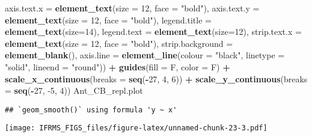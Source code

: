 \documentclass[
]{article}
\newenvironment{Shaded}{\begin{snugshade}}{\end{snugshade}}
\newcommand{\DataTypeTok}[1]{\textcolor[rgb]{0.13,0.29,0.53}{#1}}
\newcommand{\DecValTok}[1]{\textcolor[rgb]{0.00,0.00,0.81}{#1}}
\newcommand{\KeywordTok}[1]{\textcolor[rgb]{0.13,0.29,0.53}{\textbf{#1}}}
\newcommand{\NormalTok}[1]{#1}
\newcommand{\OperatorTok}[1]{\textcolor[rgb]{0.81,0.36,0.00}{\textbf{#1}}}
\newcommand{\StringTok}[1]{\textcolor[rgb]{0.31,0.60,0.02}{#1}}
\begin{document}
\begin{Shaded}
\begin{Highlighting}[]
         \DataTypeTok{axis.text.x =} \KeywordTok{element_text}\NormalTok{(}\DataTypeTok{size =} \DecValTok{12}\NormalTok{, }\DataTypeTok{face =} \StringTok{"bold"}\NormalTok{),}
         \DataTypeTok{axis.text.y =} \KeywordTok{element_text}\NormalTok{(}\DataTypeTok{size =} \DecValTok{12}\NormalTok{, }\DataTypeTok{face =} \StringTok{"bold"}\NormalTok{),}
         \DataTypeTok{legend.title =} \KeywordTok{element_text}\NormalTok{(}\DataTypeTok{size=}\DecValTok{14}\NormalTok{), }
         \DataTypeTok{legend.text =} \KeywordTok{element_text}\NormalTok{(}\DataTypeTok{size=}\DecValTok{12}\NormalTok{),}
         \DataTypeTok{strip.text.x =} \KeywordTok{element_text}\NormalTok{(}\DataTypeTok{size =} \DecValTok{12}\NormalTok{, }\DataTypeTok{face =} \StringTok{"bold"}\NormalTok{),}
         \DataTypeTok{strip.background =} \KeywordTok{element_blank}\NormalTok{(),}
         \DataTypeTok{axis.line =} \KeywordTok{element_line}\NormalTok{(}\DataTypeTok{colour =} \StringTok{"black"}\NormalTok{, }\DataTypeTok{linetype =} \StringTok{"solid"}\NormalTok{, }\DataTypeTok{lineend =} \StringTok{"round"}\NormalTok{)) }\OperatorTok{+}
\StringTok{   }\KeywordTok{guides}\NormalTok{(}\DataTypeTok{fill =}\NormalTok{ F, }\DataTypeTok{color =}\NormalTok{ F) }\OperatorTok{+}\StringTok{ }
\StringTok{   }\KeywordTok{scale_x_continuous}\NormalTok{(}\DataTypeTok{breaks =} \KeywordTok{seq}\NormalTok{(}\OperatorTok{-}\DecValTok{27}\NormalTok{, }\DecValTok{4}\NormalTok{, }\DecValTok{6}\NormalTok{)) }\OperatorTok{+}\StringTok{ }
\StringTok{   }\KeywordTok{scale_y_continuous}\NormalTok{(}\DataTypeTok{breaks =} \KeywordTok{seq}\NormalTok{(}\OperatorTok{-}\DecValTok{27}\NormalTok{, }\DecValTok{-5}\NormalTok{, }\DecValTok{4}\NormalTok{))}
\NormalTok{Ant_CB_repl.plot}
\end{Highlighting}
\end{Shaded}

\begin{verbatim}
## `geom_smooth()` using formula 'y ~ x'
\end{verbatim}

\texttt{[image: IFRMS\_FIGS\_files/figure-latex/unnamed-chunk-23-3.pdf]}
\end{document}
